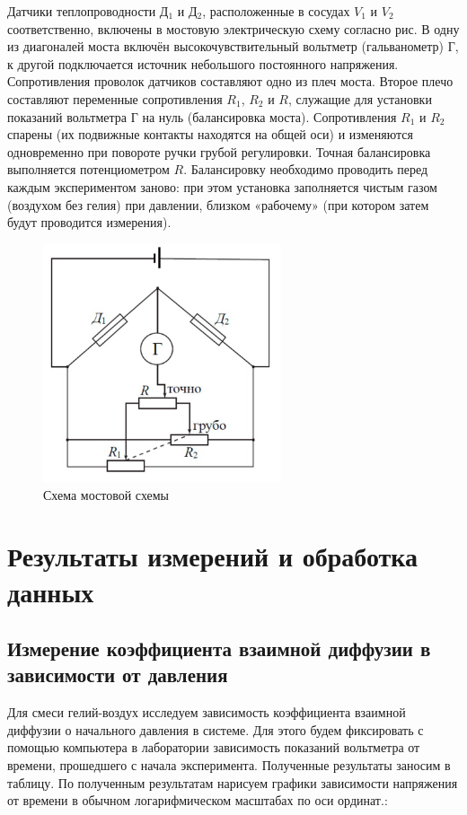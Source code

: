 \documentclass[12pt,a4paper]{article}
\begin{document}
Датчики теплопроводности Д$ _1 $ и Д$ _2 $, расположенные в сосудах $ V_1 $ и $ V_2 $ соответственно, включены в мостовую электрическую схему согласно рис. В одну из диагоналей моста включён высокочувствительный вольтметр (гальванометр) Г, к другой подключается источник небольшого постоянного напряжения. Сопротивления проволок датчиков составляют одно из плеч моста. Второе плечо составляют переменные сопротивления $ R_1 $, $ R_2 $ и $ R $, служащие для установки показаний вольтметра Г на нуль (балансировка моста). Сопротивления $ R_1 $ и $ R_2 $ спарены (их подвижные контакты находятся на общей оси) и изменяются одновременно при повороте ручки грубой регулировки. Точная балансировка выполняется потенциометром $ R $. Балансировку необходимо проводить перед каждым экспериментом заново: при этом установка заполняется чистым газом (воздухом без гелия) при давлении, близком «рабочему» (при котором затем будут проводится измерения).

\begin{figure}[H]
	\begin{center}
		\includegraphics[width=7cm]{2.2.1_5}
	\end{center}
	\caption{Схема мостовой схемы}
	\label{ris5}
\end{figure}

\section{Результаты измерений и обработка данных}

\subsection{Измерение коэффициента взаимной диффузии в зависимости от давления}

Для смеси гелий-воздух исследуем зависимость коэффициента взаимной диффузии о начального давления в системе. Для этого будем фиксировать с помощью компьютера в лаборатории зависимость показаний вольтметра от времени, прошедшего с начала эксперимента. Полученные результаты заносим в таблицу. По полученным результатам нарисуем графики зависимости напряжения от времени в обычном логарифмическом масштабах по оси ординат.:
\end{document}
